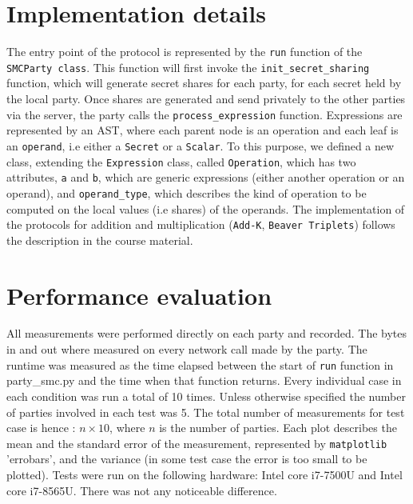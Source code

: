 \documentclass[10pt,conference,compsocconf]{IEEEtran}
\begin{document}
\section{Implementation details}
The entry point of the protocol is represented by the \texttt{run} function of the \texttt{SMCParty class}.
This function will first invoke the \texttt{init\_secret\_sharing} function, which will generate secret shares for each party, for each secret held by the local party.
Once shares are generated and send privately to the other parties via the server, the party calls the \texttt{process\_expression} function.
Expressions are represented by an AST, where each parent node is an operation and each leaf is an \texttt{operand}, i.e either a \texttt{Secret} or a \texttt{Scalar}.
To this purpose, we defined a new class, extending the \texttt{Expression} class, called \texttt{Operation}, which has two attributes, \texttt{a} and \texttt{b},
which are generic expressions (either another operation or an operand), and \texttt{operand\_type}, which describes the kind of operation to be computed on the local values (i.e shares)
of the operands.
The implementation of the protocols for addition and multiplication (\texttt{Add-K}, \texttt{Beaver Triplets}) follows the description in the course material.

\section{Performance evaluation}
All measurements were performed directly on each party and recorded.
The bytes in and out where measured on every
network call made by the party.
The runtime was measured as the time elapsed between the start of \texttt{run} function in
party\_smc.py and the time when that function returns.
Every individual case in each condition was run a total of 10 times.
Unless otherwise specified the number of parties involved in each test was 5.
The total number of measurements for test case is hence : $n \times 10$, where $n$ is the number of parties.
Each plot describes the mean and the standard error of the measurement, represented by \texttt{matplotlib} 'errobars', and the variance (in some test case the error is too small to be plotted).
Tests were run on the following hardware: Intel core i7-7500U and Intel core i7-8565U. There was not any noticeable difference.
\end{document}
